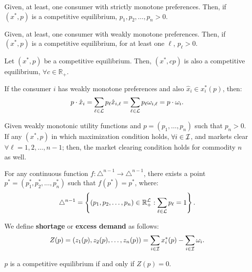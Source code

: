 \documentclass[8pt,a4paper]{extarticle}
\begin{document}
\begin{multicols}{3}
\newpage

\begin{boxprop}
	Given, at least, one consumer with strictly monotone preferences. Then, if $(x^*, p)$ is a competitive equilibrium, $p_1, p_2, \ldots, p_n > 0$.
\end{boxprop}

\begin{boxprop}
	Given, at least, one consumer with weakly monotone preferences. Then, if $(x^*, p)$ is a competitive equilibrium, for at least one $\ell$, $p_\ell > 0$.
\end{boxprop}

\begin{boxprop}
	Let $(x^*, p)$ be a competitive equilibrium. Then, $(x^*, cp)$ is also a competitive equilibrium, $\forall c \in \mathbb{R}_+$.
\end{boxprop}

\begin{boxtheo}
	If the consumer $i$ has weakly monotone preferences and also $\hat{x}_i \in x^*_i (p)$, then:
	\[
		p \cdot \hat{x}_i = \sum_{\ell \in \mathcal{L}} p_\ell \hat{x}_{i, \ell} = \sum_{\ell \in \mathcal{L}} p_\ell \omega_{i, \ell} = p \cdot \omega_i
	.\] 
\end{boxtheo}

\begin{boxcor}
	Given weakly monotonic utility functions and $p = (p_1, \ldots, p_n)$ such that $p_n > 0$. If any $(x^*, p)$ in which maximization condition holds, $\forall i \in \mathcal{I}$, and markets clear $\forall \ell = 1, 2, \ldots, n - 1$; then, the market clearing condition holds for commodity $n$ as well.
\end{boxcor}

\begin{boxtheo}
	For any continuous function $f : \triangle^{n - 1} \to \triangle^{n - 1}$, there exists a point $p^* = (p^*_1, p^*_2, \ldots, p^*_n)$ such that $f(p^*) = p^*$, where: $$\displaystyle \triangle^{n - 1} = \left\{(p_1, p_2, \ldots, p_n) \in \mathbb{R}_+^{\mathcal{L}} : \sum_{\ell \in \mathcal{L}} p_\ell = 1 \right\}.$$
\end{boxtheo}

\begin{boxdef}[Shortage]
	We define \textbf{shortage} or \textbf{excess demand} as follows:
	\[
		Z(p) = (z_1(p), z_2(p), \ldots, z_n(p)) = \sum_{i \in \mathcal{I}} x^*_i(p) - \sum_{i \in \mathcal{I}} \omega_i
	.\] 
\end{boxdef}

\begin{boxprop}
	$p$ is a competitive equilibrium if and only if $Z(p) = 0$.
\end{boxprop}


\end{multicols}
\end{document}
